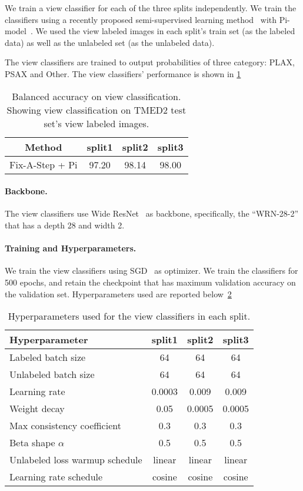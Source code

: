 We train a view classifier for each of the three splits independently. We train the classifiers using a recently proposed semi-supervised learning method~\citep{huang2022fix} with Pi-model~\citep{laine2016temporal}. We used the view labeled images in each split's train set (as the labeled data) as well as the unlabeled set (as the unlabeled data). 

The view classifiers are trained to output probabilities of three category: PLAX, PSAX and Other. The view classifiers' performance is shown in \ref{tab:viewclassifier_performance}

\begin{table}[h]
\centering
\begin{tabular}{c|c|c|c}
Method & split1 & split2 & split3 \\
\hline
Fix-A-Step + Pi  & 97.20  & 98.14 & 98.00

\end{tabular}
\caption{Balanced accuracy on view classification. Showing view classification on TMED2 test set's view labeled images.}
\label{tab:viewclassifier_performance}
\end{table}

\paragraph{Backbone.} The view classifiers use Wide ResNet~\citep{zagoruyko2016wide} as backbone,  specifically, the ``WRN-28-2'' that has a depth 28 and width 2.

\paragraph{Training and Hyperparameters.} We train the view classifiers using SGD~\citep{robbins1951stochastic} as optimizer. We train the classifiers for 500 epochs, and retain the checkpoint that has maximum validation accuracy on the validation set. Hyperparameters used are reported below~\ref{tab:ViewClassifier hyperparameters}

\begin{table}[!htb]
\centering
\begin{tabular}{l|c|c|c}
Hyperparameter & split1 & split2 & split3 \\
\midrule
Labeled batch size & 64 & 64 & 64 \\
Unlabeled batch size & 64 & 64 & 64 \\
Learning rate & 0.0003 & 0.009 & 0.009 \\
Weight decay & 0.05 & 0.0005 & 0.0005 \\
Max consistency coefficient & 0.3 & 0.3 & 0.3 \\
Beta shape $\alpha$ & 0.5 & 0.5 & 0.5 \\
Unlabeled loss warmup schedule & linear & linear & linear \\
Learning rate schedule & cosine & cosine & cosine\\
\end{tabular}
\caption{Hyperparameters used for the view classifiers in each split.}
\label{tab:ViewClassifier hyperparameters}
\end{table}


